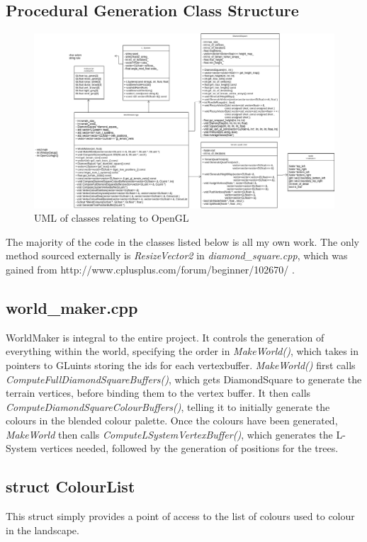 \documentclass[a4paper,10pt]{report}
\begin{document}
\clearpage
\subsection{Procedural Generation Class Structure}

\begin{figure}[h!]
\centering
  \includegraphics[width=1\textwidth]{GenerationUML.png}
 \caption{UML of classes relating to OpenGL}
 \label{fig:GenerationUML}
\end{figure}

The majority of the code in the classes listed below is all my own work. The only method sourced externally is \textit{ResizeVector2} in \textit{diamond\_square.cpp}, which was gained from http://www.cplusplus.com/forum/beginner/102670/ .

\subsection{world\_maker.cpp}
WorldMaker is integral to the entire project. It controls the generation of everything within the world, specifying the order in \textit{MakeWorld()}, which takes in pointers to GLuints storing the ids for each vertexbuffer. \textit{MakeWorld()} first calls \textit{ComputeFullDiamondSquareBuffers()}, which gets DiamondSquare to generate the terrain vertices, before binding them to the vertex buffer. It then calls \textit{ComputeDiamondSquareColourBuffers()}, telling it to initially generate the colours in the blended colour palette. Once the colours have been generated, \textit{MakeWorld} then calls \textit{ComputeLSystemVertexBuffer()}, which generates the L-System vertices needed, followed by the generation of positions for the trees.

\subsection{struct ColourList}
This struct simply provides a point of access to the list of colours used to colour in the landscape.
\end{document}
